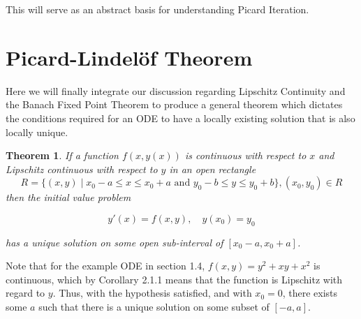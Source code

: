 \documentclass{article}
\newtheorem{theorem}{Theorem}[section]
\theoremstyle{remark}
\begin{document}
This will serve as an abstract basis for understanding Picard Iteration.

\section{Picard-Lindelöf Theorem}
Here we will finally integrate our discussion regarding Lipschitz Continuity and the Banach Fixed Point Theorem to produce a general theorem which dictates the conditions required for an ODE to have a locally existing solution that is also locally unique.




\begin{theorem}If a function $f(x,y(x))$ is continuous with respect to $x$ and Lipschitz continuous with respect to $y$ in an open rectangle
$$R = \{(x,y)\mid x_0-a\leq x \leq x_0+a \text{ and } y_0-b\leq y\leq y_0+b\}, (x_0, y_0) \in R$$
then the initial value problem 

$$y'(x) = f(x,y), \quad y(x_0) = y_0$$

has a unique solution on some open sub-interval of $[x_0-a, x_0+a]$.
\end{theorem}

Note that for the example ODE in section 1.4, $f(x,y) = y^2 +xy + x^2$ is continuous, which by Corollary 2.1.1 means that the function is Lipschitz with regard to $y$. Thus, with the hypothesis satisfied, and with $x_0 = 0$, there exists some $a$ such that there is a unique solution on some subset of $[-a, a]$.
\end{document}

